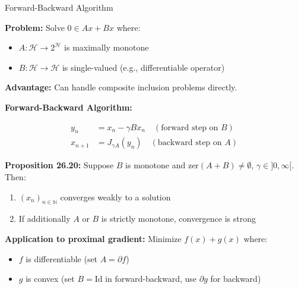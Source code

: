 \documentclass[aspectratio=169,10pt]{beamer}
\begin{document}
\begin{frame}[allowframebreaks]{Forward-Backward Algorithm}

\textbf{Problem:} Solve $0 \in Ax + Bx$ where:
\begin{itemize}
  \item $A: \mathcal{H} \to 2^{\mathcal{H}}$ is maximally monotone
  \item $B: \mathcal{H} \to \mathcal{H}$ is single-valued (e.g., differentiable operator)
\end{itemize}

\vspace{0.3cm}
\textbf{Advantage:} Can handle composite inclusion problems directly.

\vspace{0.3cm}
\textbf{Forward-Backward Algorithm:}

\begin{align*}
  y_n &= x_n - \gamma B x_n \quad (\text{forward step on } B) \\
  x_{n+1} &= J_{\gamma A}(y_n) \quad (\text{backward step on } A)
\end{align*}

\vspace{0.3cm}
\textbf{Proposition 26.20:} Suppose $B$ is monotone and $\text{zer}(A + B) \neq \emptyset$, $\gamma \in ]0, \infty[$. Then:
\begin{enumerate}
  \item[(i)] $(x_n)_{n \in \mathbb{N}}$ converges weakly to a solution
  \item[(ii)] If additionally $A$ or $B$ is strictly monotone, convergence is strong
\end{enumerate}

\pagebreak

\textbf{Application to proximal gradient:} Minimize $f(x) + g(x)$ where:
\begin{itemize}
  \item $f$ is differentiable (set $A = \partial f$)
  \item $g$ is convex (set $B = \text{Id}$ in forward-backward, use $\partial g$ for backward)
\end{itemize}

\end{frame}

\end{document}
